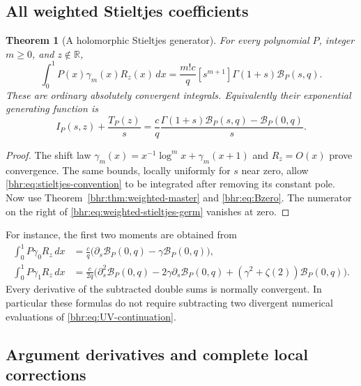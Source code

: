 \documentclass[11pt]{article}
\numberwithin{equation}{section}
\theoremstyle{plain}
\newtheorem{theorem}{Theorem}[section]
\theoremstyle{definition}
\theoremstyle{remark}
\newcommand{\R}{\mathbb R}
\begin{document}
\subsection{All weighted Stieltjes coefficients}

\begin{theorem}[A holomorphic Stieltjes generator]\label{bhr:thm:weighted-stieltjes}
For every polynomial $P$, integer $m\ge0$, and $z\notin\R$,
\begin{equation}\label{bhr:eq:weighted-stieltjes}
 \boxed{\displaystyle
 \int_0^1P(x)\gamma_m(x)R_z(x)\,dx
   =\frac{m!c}{q}[s^{m+1}]
               \Gamma(1+s)\mathcal B_P(s,q).}
\end{equation}
These are ordinary absolutely convergent integrals.
Equivalently their exponential generating function is
\begin{equation}\label{bhr:eq:weighted-stieltjes-germ}
 I_P(s,z)+\frac{T_P(z)}s
   =\frac cq\frac{\Gamma(1+s)\mathcal B_P(s,q)
                          -\mathcal B_P(0,q)}s.
\end{equation}
\end{theorem}
\begin{proof}
The shift law
$\gamma_m(x)=x^{-1}\log^m x+\gamma_m(x+1)$ and $R_z=O(x)$
prove convergence. The same bounds, locally uniformly for $s$
near zero, allow \eqref{bhr:eq:stieltjes-convention} to be integrated
after removing its constant pole. Now use Theorem~\ref{bhr:thm:weighted-master}
and \eqref{bhr:eq:Bzero}. The numerator on the right of
\eqref{bhr:eq:weighted-stieltjes-germ} vanishes at zero.
\end{proof}

For instance, the first two moments are obtained from
\begin{align}
 \int_0^1P\gamma_0R_z\,dx
  &=\frac cq\bigl(\partial_s\mathcal B_P(0,q)
                                      -\gamma\mathcal B_P(0,q)\bigr),\\
 \int_0^1P\gamma_1R_z\,dx
  &=\frac c{2q}\bigl(\partial_s^2\mathcal B_P(0,q)
       -2\gamma\partial_s\mathcal B_P(0,q)
                +(\gamma^2+\zeta(2))\mathcal B_P(0,q)\bigr).
\end{align}
Every derivative of the subtracted double sums is normally
convergent. In particular these formulas do not require subtracting
two divergent numerical evaluations of \eqref{bhr:eq:UV-continuation}.

\subsection{Argument derivatives and complete local corrections}
\end{document}
